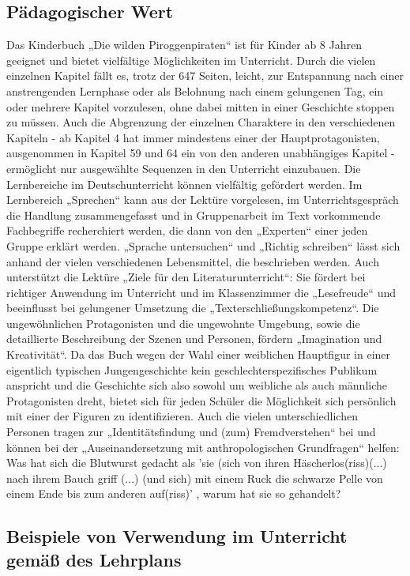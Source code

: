 {\subsection{Pädagogischer Wert}
Das Kinderbuch „Die wilden Piroggenpiraten“ ist für Kinder ab 8 Jahren geeignet und bietet vielfältige Möglichkeiten im Unterricht. Durch die vielen einzelnen Kapitel fällt es, trotz der 647 Seiten, leicht, zur Entspannung nach einer anstrengenden Lernphase oder als Belohnung nach einem gelungenen Tag, ein oder mehrere Kapitel vorzulesen, ohne dabei mitten in einer Geschichte stoppen zu müssen. Auch die Abgrenzung der einzelnen Charaktere in den verschiedenen Kapiteln - ab Kapitel 4 hat immer mindestens einer der Hauptprotagonisten, ausgenommen in Kapitel 59 und 64 ein von den anderen unabhängiges Kapitel - ermöglicht nur ausgewählte Sequenzen in den Unterricht einzubauen. Die Lernbereiche im Deutschunterricht können vielfältig gefördert werden. Im Lernbereich „Sprechen“  kann aus der Lektüre vorgelesen, im Unterrichtsgespräch die Handlung zusammengefasst und in Gruppenarbeit im Text vorkommende Fachbegriffe recherchiert werden, die dann von den „Experten“ einer jeden Gruppe erklärt werden. „Sprache untersuchen“ und „Richtig schreiben“ lässt sich anhand der vielen verschiedenen Lebensmittel, die beschrieben werden. Auch unterstützt die Lektüre „Ziele für den Literaturunterricht“: Sie fördert bei richtiger Anwendung im Unterricht und im Klassenzimmer die „Lesefreude“ und beeinflusst bei gelungener Umsetzung die „Texterschließungskompetenz“. Die ungewöhnlichen Protagonisten und die ungewohnte Umgebung, sowie die detaillierte Beschreibung der Szenen und Personen, fördern „Imagination und Kreativität“. Da das Buch wegen der Wahl einer weiblichen Hauptfigur in einer eigentlich typischen Jungengeschichte kein geschlechterspezifisches Publikum anspricht und die Geschichte sich also sowohl um weibliche als auch männliche Protagonisten dreht, bietet sich für jeden Schüler die Möglichkeit sich persönlich mit einer der Figuren zu identifizieren. Auch die vielen unterschiedlichen Personen tragen zur „Identitätsfindung und (zum) Fremdverstehen“ bei und können bei der „Auseinandersetzung mit anthropologischen Grundfragen“ helfen: Was hat sich die Blutwurst gedacht  als 'sie (sich von ihren Häscherlos(riss)(...) nach ihrem Bauch griff (...) (und sich) mit einem Ruck die schwarze Pelle von einem Ende bis zum anderen auf(riss)' \cite[S.229]{pir},  warum hat sie so gehandelt?



\subsection{Beispiele von Verwendung im Unterricht gemäß des Lehrplans}

}
